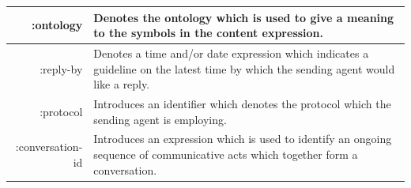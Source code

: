 \documentclass[main.tex]{subfiles}
\begin{document}
\begin{table}[htbp]
\begin{tabularx}{.8\textwidth}{>{\ttfamily}rX}
        :ontology                                                          & Denotes the ontology which is used to give a
        meaning to the symbols in the content expression.                                                                          \\\midrule
        :reply-by                                                          & Denotes a time and/or date expression which
        indicates a guideline on the latest time by which the
        sending agent would like a reply.                                                                                          \\\midrule
        :protocol                                                          & Introduces an identifier which denotes the protocol
        which the sending agent is employing.                                                                                      \\\midrule
        :conversation-id                                                   & Introduces an expression which is used to identify an
        ongoing sequence of communicative acts which
        together form a conversation.                                                                                              \\\bottomrule
    \end{tabularx}
    \label{message-parameters}
\end{table}
\clearpage
\end{document}
